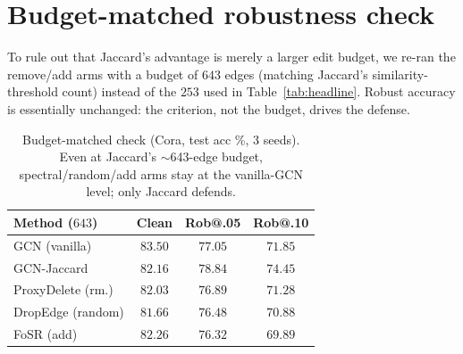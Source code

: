 \documentclass[11pt]{article}
\begin{document}
\section{Budget-matched robustness check}
To rule out that Jaccard's advantage is merely a larger edit budget, we re-ran the remove/add arms with a
budget of $643$ edges (matching Jaccard's similarity-threshold count) instead of the $253$ used in
Table~\ref{tab:headline}. Robust accuracy is essentially unchanged: the criterion, not the budget, drives
the defense.

\begin{table}[h]
\centering\small
\begin{tabular}{@{}lccc@{}}
\toprule
\textbf{Method} ($643$) & \textbf{Clean} & \textbf{Rob@.05} & \textbf{Rob@.10} \\
\midrule
GCN (vanilla)        & $83.50$ & $77.05$ & $71.85$ \\
GCN-Jaccard          & $82.16$ & $\mathbf{78.84}$ & $\mathbf{74.45}$ \\
ProxyDelete (rm.)    & $82.03$ & $76.89$ & $71.28$ \\
DropEdge (random)    & $81.66$ & $76.48$ & $70.88$ \\
FoSR (add)           & $82.26$ & $76.32$ & $69.89$ \\
\bottomrule
\end{tabular}
\caption{Budget-matched check (Cora, test acc \%, 3 seeds). Even at Jaccard's $\sim$643-edge budget,
spectral/random/add arms stay at the vanilla-GCN level; only Jaccard defends.}
\end{table}
\end{document}
